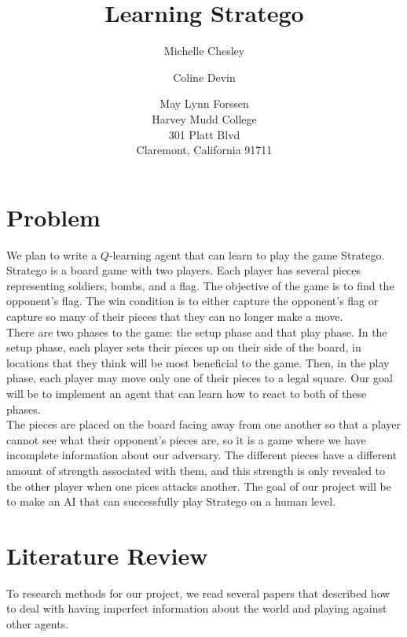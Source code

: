 \documentclass[letterpaper]{article}
\begin{document}
\title {Learning Stratego}
\author{Michelle Chesley \and Coline Devin \and May Lynn Forssen\\
Harvey Mudd College\\
301 Platt Blvd\\
Claremont, California 91711\\
}  
%
\maketitle

\section{Problem }
We plan to write a $Q$-learning agent that can learn to play the game Stratego. Stratego is a board game with two players. Each player has several pieces representing soldiers, bombs, and a flag. The objective of the game is to find the opponent's flag. The win condition is to either capture the opponent's flag or capture so many of their pieces that they can no longer make a move. \\

There are two phases to the game: the setup phase and that play phase. In the setup phase, each player sets their pieces up on their side of the board, in locations that they think will be most beneficial to the game. Then, in the play phase, each player may move only one of their pieces to a legal square. Our goal will be to implement an agent that can learn how to react to both of these phases.\\

The pieces are placed on the board facing away from one another so that a player cannot see what their opponent's pieces are, so it is a game where we have incomplete information about our adversary. The different pieces have a different amount of strength associated with them, and this strength is only revealed to the other player when one pices attacks another. The goal of our project will be to make an AI that can successfully play Stratego on a human level.\\

\section{Literature Review}
To research methods for our project, we read several papers that described how to deal with having imperfect information about the world and playing against other agents.\\
\end{document}
